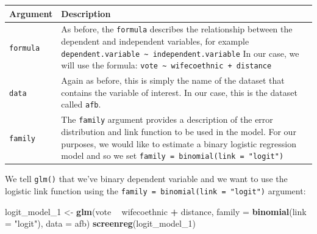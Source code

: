 \documentclass[]{article}
\newenvironment{Shaded}{\begin{snugshade}}{\end{snugshade}}
\newcommand{\KeywordTok}[1]{\textcolor[rgb]{0.13,0.29,0.53}{\textbf{#1}}}
\newcommand{\DataTypeTok}[1]{\textcolor[rgb]{0.13,0.29,0.53}{#1}}
\newcommand{\DecValTok}[1]{\textcolor[rgb]{0.00,0.00,0.81}{#1}}
\newcommand{\StringTok}[1]{\textcolor[rgb]{0.31,0.60,0.02}{#1}}
\newcommand{\OperatorTok}[1]{\textcolor[rgb]{0.81,0.36,0.00}{\textbf{#1}}}
\newcommand{\NormalTok}[1]{#1}
\theoremstyle{definition}
\theoremstyle{definition}
\theoremstyle{definition}
\theoremstyle{remark}
\begin{document}
\begin{longtable}[]{@{}ll@{}}
\toprule
\begin{minipage}[b]{0.12\columnwidth}\raggedright\strut
Argument\strut
\end{minipage} & \begin{minipage}[b]{0.78\columnwidth}\raggedright\strut
Description\strut
\end{minipage}\tabularnewline
\midrule
\endhead
\begin{minipage}[t]{0.12\columnwidth}\raggedright\strut
\texttt{formula}\strut
\end{minipage} & \begin{minipage}[t]{0.78\columnwidth}\raggedright\strut
As before, the \texttt{formula} describes the relationship between the
dependent and independent variables, for example
\texttt{dependent.variable\ \textasciitilde{}\ independent.variable} In
our case, we will use the formula:
\texttt{vote\ \textasciitilde{}\ wifecoethnic\ +\ distance}\strut
\end{minipage}\tabularnewline
\begin{minipage}[t]{0.12\columnwidth}\raggedright\strut
\texttt{data}\strut
\end{minipage} & \begin{minipage}[t]{0.78\columnwidth}\raggedright\strut
Again as before, this is simply the name of the dataset that contains
the variable of interest. In our case, this is the dataset called
\texttt{afb}.\strut
\end{minipage}\tabularnewline
\begin{minipage}[t]{0.12\columnwidth}\raggedright\strut
\texttt{family}\strut
\end{minipage} & \begin{minipage}[t]{0.78\columnwidth}\raggedright\strut
The \texttt{family} argument provides a description of the error
distribution and link function to be used in the model. For our
purposes, we would like to estimate a binary logistic regression model
and so we set \texttt{family\ =\ binomial(link\ =\ "logit")}\strut
\end{minipage}\tabularnewline
\bottomrule
\end{longtable}

We tell \texttt{glm()} that we've binary dependent variable and we want
to use the logistic link function using the
\texttt{family\ =\ binomial(link\ =\ "logit")} argument:

\begin{Shaded}
\begin{Highlighting}[]
\NormalTok{logit_model_}\DecValTok{1}\NormalTok{ <-}\StringTok{ }\KeywordTok{glm}\NormalTok{(vote }\OperatorTok{~}\StringTok{ }\NormalTok{wifecoethnic }\OperatorTok{+}\StringTok{ }\NormalTok{distance,}
                     \DataTypeTok{family =} \KeywordTok{binomial}\NormalTok{(}\DataTypeTok{link =} \StringTok{"logit"}\NormalTok{), }\DataTypeTok{data =}\NormalTok{ afb)}
\KeywordTok{screenreg}\NormalTok{(logit_model_}\DecValTok{1}\NormalTok{)}
\end{Highlighting}
\end{Shaded}
\end{document}
